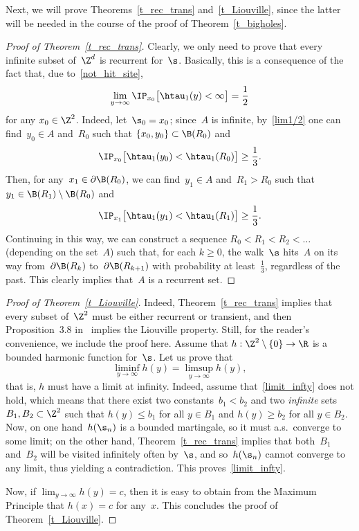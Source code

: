 Next, we will prove Theorems~\ref{t_rec_trans} and~\ref{t_Liouville}, since the latter will be needed in the course of the proof of Theorem~\ref{t_bigholes}.

\begin{proof}[Proof of Theorem~\ref{t_rec_trans}]
Clearly, we only need to prove that every infinite subset of~$\Z^d$ is recurrent for~$\s$. Basically, this is a consequence of the fact that, due to~\eqref{not_hit_site},
\begin{equation}\label{lim1/2}
\lim_{y\to\infty} \IP_{x_0}\big[\htau_1(y)<\infty\big] = \frac{1}{2}
\end{equation}
for any $x_0\in\Z^2$. Indeed, let~$\s_0=x_0$; since~$A$ is infinite, by~\eqref{lim1/2} one can find~$y_0\in A$ and~$R_0$ such that $\{x_0,y_0\}\subset \B(R_0)$ and
\[
\IP_{x_0}\big[\htau_1(y_0)<\htau_1(R_0)\big] \geq \frac{1}{3}.
\]
Then, for any~$x_1\in \partial\B(R_0)$, we can find~$y_1\in A$ and~$R_1>R_0$ such that $y_1\in \B(R_1)\setminus \B(R_0)$ and
\[
\IP_{x_1}\big[\htau_1(y_1)<\htau_1(R_1)\big] \geq \frac{1}{3}.
\]
Continuing in this way, we can construct a sequence $R_0<R_1<R_2<\ldots$ (depending on the set~$A$) such that, for each $k\geq 0$, the walk~$\s$ hits~$A$ on its way from~$\partial\B(R_k)$ to~$\partial\B(R_{k+1})$ with probability at least~$\frac{1}{3}$, regardless of the past. This clearly implies that~$A$ is a recurrent set.
\end{proof}

\begin{proof}[Proof of Theorem~\ref{t_Liouville}]
Indeed, Theorem~\ref{t_rec_trans} implies that every subset of~$\Z^2$ must be either recurrent or transient, and then Proposition~3.8 in~\cite[Chapter~2]{R84} implies the Liouville property. Still, for the reader's convenience, we include the proof here. Assume that $h:\Z^2\setminus\{0\} \to \R$ is a bounded harmonic function for~$\s$. Let us prove that
\begin{equation}\label{limit_infty}
\liminf_{y\to \infty}h(y) = \limsup_{y\to \infty}h(y),
\end{equation}
that is, $h$ must have a limit at infinity. Indeed, assume that~\eqref{limit_infty} does not hold, which means that there exist two constants~$b_1<b_2$ and two \emph{infinite} sets $B_1,B_2\subset\Z^2$ such that $h(y)\leq b_1$ for all $y\in B_1$ and $h(y) \geq b_2$ for all $y\in B_2$. Now, on one hand~$h(\s_n)$ is a bounded martingale, so it must a.s.\ converge to some limit; on the other hand, Theorem~\ref{t_rec_trans} implies that both~$B_1$ and~$B_2$ will be visited infinitely often by~$\s$, and so~$h(\s_n)$ cannot converge to any limit, thus yielding a contradiction. This proves~\eqref{limit_infty}.

Now, if $\lim_{y\to \infty}h(y)=c$, then it is easy to obtain from the Maximum Principle that $h(x)=c$ for any~$x$. This concludes the proof of Theorem~\ref{t_Liouville}.
\end{proof}

